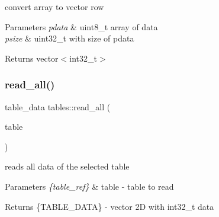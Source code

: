 convert array to vector row 


\begin{DoxyParams}{Parameters}
{\em pdata} & uint8\+\_\+t array of data \\
\hline
{\em psize} & uint32\+\_\+t with size of pdata \\
\hline
\end{DoxyParams}
\begin{DoxyReturn}{Returns}
vector$<$int32\+\_\+t$>$ 
\end{DoxyReturn}
\mbox{\label{namespacetables_a27170b1a1036e75516b990dc97ea5835}} 
\subsubsection{\texorpdfstring{read\+\_\+all()}{read\_all()}}
{\footnotesize\ttfamily table\+\_\+data tables\+::read\+\_\+all (\begin{DoxyParamCaption}\item[{\hyperlink{structtable__ref}{table\+\_\+ref}}]{table }\end{DoxyParamCaption})}



reads all data of the selected table 


\begin{DoxyParams}{Parameters}
{\em \{table\+\_\+ref\}} & table -\/ table to read \\
\hline
\end{DoxyParams}
\begin{DoxyReturn}{Returns}
\{T\+A\+B\+L\+E\+\_\+\+D\+A\+TA\} -\/ vector 2D with int32\+\_\+t data 
\end{DoxyReturn}
